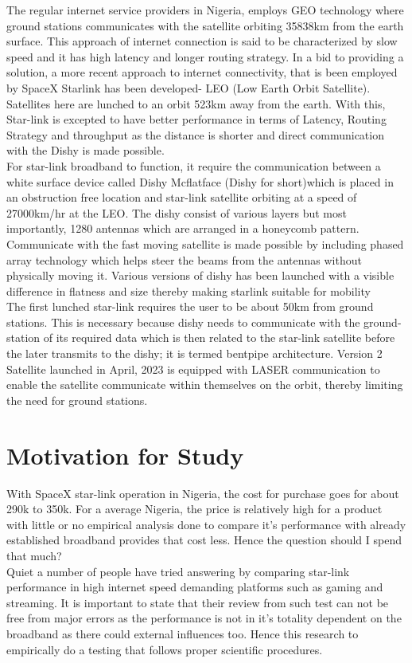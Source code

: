 	The regular internet service providers in Nigeria, employs GEO technology where ground stations communicates with the satellite orbiting 35838km from the earth surface. This approach of internet connection is said to be characterized by slow speed and it has high latency and longer routing strategy.
	In a bid to providing a solution, a more recent approach to internet connectivity, that is been employed by SpaceX Starlink has been developed- LEO (Low Earth Orbit Satellite).
	Satellites here are lunched to an orbit 523km away from the earth. With this, Star-link is excepted to have better performance in terms of Latency, Routing Strategy and throughput as the distance is shorter and direct communication with the Dishy is made possible.\\
	For star-link broadband to function, it require the communication between a white surface device called Dishy Mcflatface (Dishy for short)which is placed in an obstruction free location and star-link satellite orbiting at a speed of 27000km/hr at the LEO.
	The dishy consist of various layers but most importantly, 1280 antennas which are arranged in a honeycomb pattern. Communicate with the fast moving satellite is made possible by including phased array technology which helps steer the beams from the antennas without physically moving it. Various versions of dishy has been launched with a visible difference in flatness and size thereby making starlink suitable for mobility\\
	The first lunched star-link requires the user to be about 50km from ground stations. This  is necessary because dishy needs to communicate with the ground-station of its required data which is then related to the star-link satellite before the later transmits to the dishy; it is termed bentpipe architecture. Version 2 Satellite launched in April, 2023 is equipped with LASER communication to enable the satellite communicate within themselves on the orbit, thereby limiting the need for ground stations.

\section{Motivation for Study}
 With SpaceX star-link operation in Nigeria, the cost for purchase goes for about 290k to 350k. For a average Nigeria, the price is relatively high for a product with little or no empirical analysis done to compare it's performance with already established broadband provides that cost less. Hence the question should I spend that much?\\
Quiet a number of people have tried answering by comparing star-link performance in high internet speed demanding platforms such as gaming and streaming. It is important to state that their review from such test can not be free from major errors as the performance is not in it's totality dependent on the broadband as there could external influences too. Hence this research to empirically do a testing that follows proper scientific procedures.

